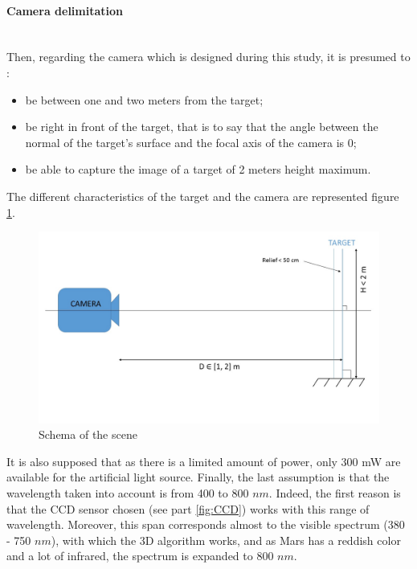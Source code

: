 \paragraph*{Camera delimitation}
~\\
Then, regarding the camera which is designed during this study, it is presumed to :
\begin{itemize}
\item be between one and two meters from the target;
\item be right in front of the target, that is to say that the angle between the normal of the target's surface and the focal axis of the camera is 0\textdegree;
\item be able to capture the image of a target of 2 meters height maximum.
\end{itemize}

The different characteristics of the target and the camera are represented figure \ref{fig:schema system}.


\begin{figure}[h]
  \centerline{\includegraphics[scale=0.4]{fig/schemaSystem.jpg}}
  \caption{Schema of the scene}
  \label{fig:schema system}
\end{figure}

It is also supposed that as there is a limited amount of power, only 300 mW are available for the artificial light source. Finally, the last assumption is that the wavelength taken into account is from 400 to 800 $nm$. Indeed, the first reason is that the CCD sensor chosen (see part \ref{fig:CCD}) works with this range of wavelength. Moreover, this span corresponds almost to the visible spectrum (380 - 750 $nm$), with which the 3D algorithm works, and as Mars has a reddish color and a lot of infrared, the spectrum is expanded to 800 $nm$.
